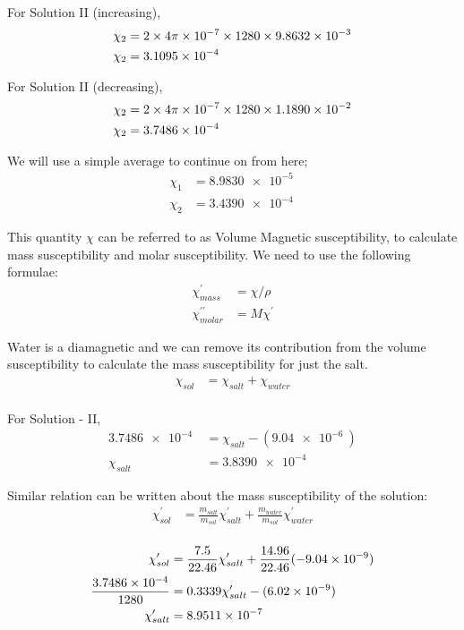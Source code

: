 \documentclass[../main.tex]{subfiles}
\begin{document}
For Solution II (increasing),
\begin{align*}
	\chi_2 &= 2 \times 4 \pi \times \SI{e-7}{} \times 1280 \times \SI{9.8632e-03}{} \\
	\chi_2 &= \SI{3.1095e-04}{}
\end{align*}

For Solution II (decreasing),
\begin{align*}
	\chi_2 &= 2 \times 4 \pi \times \SI{e-7}{} \times 1280 \times \SI{1.1890e-02}{} \\
	\chi_2 &= \SI{3.7486e-04}{}
\end{align*}

We will use a simple average to continue on from here;
\begin{align*}
	\chi_1 &= \SI{8.9830e-5}{} \\
	\chi_2 &= \SI{3.4390e-4}{} 
\end{align*}

This quantity $\chi$ can be referred to as Volume Magnetic susceptibility, to calculate mass susceptibility and molar susceptibility. We need to use the following formulae:
\begin{align*}
	\chi^{\prime}_{mass} &= \chi/\rho \\
\chi^{\prime\prime}_{molar} &= M\chi^{\prime}
\end{align*}

Water is a diamagnetic and we can remove its contribution from the volume susceptibility to calculate the mass susceptibility for just the salt. 
\begin{align*}
	\chi_{sol} &= \chi_{salt} + \chi_{water} \\ 
\end{align*}

For Solution - II,
\begin{align*}
	\SI{3.7486e-4}{} &= \chi_{salt} - (\SI{9.04e-6}{}) \\ 
	\chi_{salt} &= \SI{3.8390e-4}{}
\end{align*}

Similar relation can be written about the mass susceptibility of the solution:
\begin{align*}
	\chi^{\prime}_{sol} &= \frac{m_{salt}}{m_{sol}}\chi^{\prime}_{salt} + \frac{m_{water}}{m_{sol}}\chi^{\prime}_{water} \\ 
\end{align*}

\begin{align*}
	\chi^{\prime}_{sol} &= \frac{7.5}{22.46}\chi^{\prime}_{salt} + \frac{14.96}{22.46}(\SI{- 9.04e-9}{}) \\
	\frac{\SI{3.7486e-4}{}}{1280} &= 0.3339\chi^{\prime}_{salt} - (\SI{6.02e-9}{}) \\ 
	\chi^{\prime}_{salt} &=  \SI{8.9511e-7}{}
\end{align*}
\end{document}
